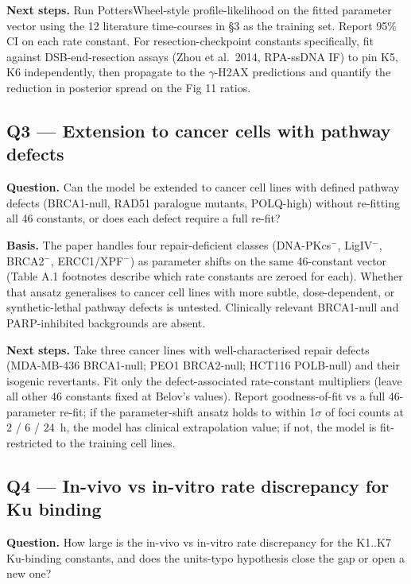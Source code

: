 \textbf{Next steps.} Run PottersWheel-style profile-likelihood on the fitted
parameter vector using the 12 literature time-courses in \S3 as the training set.
Report 95\% CI on each rate constant. For resection-checkpoint constants
specifically, fit against DSB-end-resection assays (Zhou et al.\ 2014, RPA-ssDNA
IF) to pin K5, K6 independently, then propagate to the $\gamma$-H2AX predictions
and quantify the reduction in posterior spread on the Fig 11 ratios.

\subsection*{Q3 --- Extension to cancer cells with pathway defects}

\textbf{Question.} Can the model be extended to cancer cell lines with defined
pathway defects (BRCA1-null, RAD51 paralogue mutants, POLQ-high) without re-fitting
all 46 constants, or does each defect require a full re-fit?

\textbf{Basis.} The paper handles four repair-deficient classes (DNA-PKcs$^-$,
LigIV$^-$, BRCA2$^-$, ERCC1/XPF$^-$) as parameter shifts on the same 46-constant
vector (Table A.1 footnotes describe which rate constants are zeroed for each).
Whether that ansatz generalises to cancer cell lines with more subtle,
dose-dependent, or synthetic-lethal pathway defects is untested. Clinically
relevant BRCA1-null and PARP-inhibited backgrounds are absent.

\textbf{Next steps.} Take three cancer lines with well-characterised repair
defects (MDA-MB-436 BRCA1-null; PEO1 BRCA2-null; HCT116 POLB-null) and their
isogenic revertants. Fit only the defect-associated rate-constant multipliers
(leave all other 46 constants fixed at Belov's values). Report goodness-of-fit
vs a full 46-parameter re-fit; if the parameter-shift ansatz holds to within
1$\sigma$ of foci counts at 2 / 6 / 24~h, the model has clinical extrapolation
value; if not, the model is fit-restricted to the training cell lines.

\subsection*{Q4 --- In-vivo vs in-vitro rate discrepancy for Ku binding}

\textbf{Question.} How large is the in-vivo vs in-vitro rate discrepancy for
the K1..K7 Ku-binding constants, and does the units-typo hypothesis close the
gap or open a new one?

